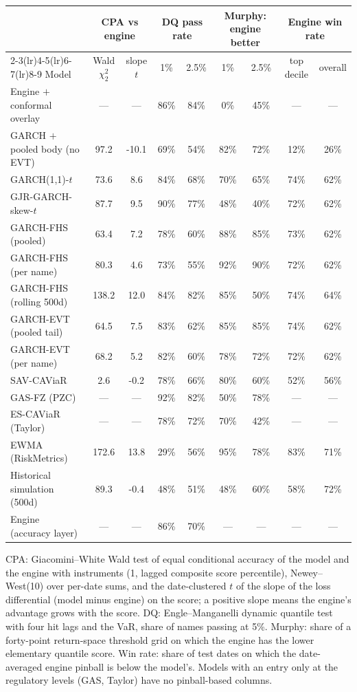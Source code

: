 \begin{tabular}{lcccccccc}
\toprule
& \multicolumn{2}{c}{CPA vs engine} & \multicolumn{2}{c}{DQ pass rate} & \multicolumn{2}{c}{Murphy: engine better} & \multicolumn{2}{c}{Engine win rate} \\
\cmidrule(lr){2-3}\cmidrule(lr){4-5}\cmidrule(lr){6-7}\cmidrule(lr){8-9}
Model & Wald $\chi^2_2$ & slope $t$ & 1\% & 2.5\% & 1\% & 2.5\% & top decile & overall \\
\midrule
Engine $+$ conformal overlay & --- & --- & 86\% & 84\% & 0\% & 45\% & --- & --- \\
GARCH $+$ pooled body (no EVT) & 97.2 & -10.1 & 69\% & 54\% & 82\% & 72\% & 12\% & 26\% \\
GARCH(1,1)-$t$ & 73.6 & 8.6 & 84\% & 68\% & 70\% & 65\% & 74\% & 62\% \\
GJR-GARCH-skew-$t$ & 87.7 & 9.5 & 90\% & 77\% & 48\% & 40\% & 72\% & 62\% \\
GARCH-FHS (pooled) & 63.4 & 7.2 & 78\% & 60\% & 88\% & 85\% & 73\% & 62\% \\
GARCH-FHS (per name) & 80.3 & 4.6 & 73\% & 55\% & 92\% & 90\% & 72\% & 62\% \\
GARCH-FHS (rolling 500d) & 138.2 & 12.0 & 84\% & 82\% & 85\% & 50\% & 74\% & 64\% \\
GARCH-EVT (pooled tail) & 64.5 & 7.5 & 83\% & 62\% & 85\% & 85\% & 74\% & 62\% \\
GARCH-EVT (per name) & 68.2 & 5.2 & 82\% & 60\% & 78\% & 72\% & 72\% & 62\% \\
SAV-CAViaR & 2.6 & -0.2 & 78\% & 66\% & 80\% & 60\% & 52\% & 56\% \\
GAS-FZ (PZC) & --- & --- & 92\% & 82\% & 50\% & 78\% & --- & --- \\
ES-CAViaR (Taylor) & --- & --- & 78\% & 72\% & 70\% & 42\% & --- & --- \\
EWMA (RiskMetrics) & 172.6 & 13.8 & 29\% & 56\% & 95\% & 78\% & 83\% & 71\% \\
Historical simulation (500d) & 89.3 & -0.4 & 48\% & 51\% & 48\% & 60\% & 58\% & 72\% \\
\midrule
Engine (accuracy layer) & --- & --- & 86\% & 70\% & --- & --- & --- & --- \\
\bottomrule
\end{tabular}
\begin{tablenotes}\footnotesize
\item CPA: Giacomini--White Wald test of equal conditional accuracy of the model and the engine with instruments (1, lagged composite score percentile), Newey--West(10) over per-date sums, and the date-clustered $t$ of the slope of the loss differential (model minus engine) on the score; a positive slope means the engine's advantage grows with the score. DQ: Engle--Manganelli dynamic quantile test with four hit lags and the VaR, share of names passing at 5\%. Murphy: share of a forty-point return-space threshold grid on which the engine has the lower elementary quantile score. Win rate: share of test dates on which the date-averaged engine pinball is below the model's. Models with an entry only at the regulatory levels (GAS, Taylor) have no pinball-based columns.
\end{tablenotes}
